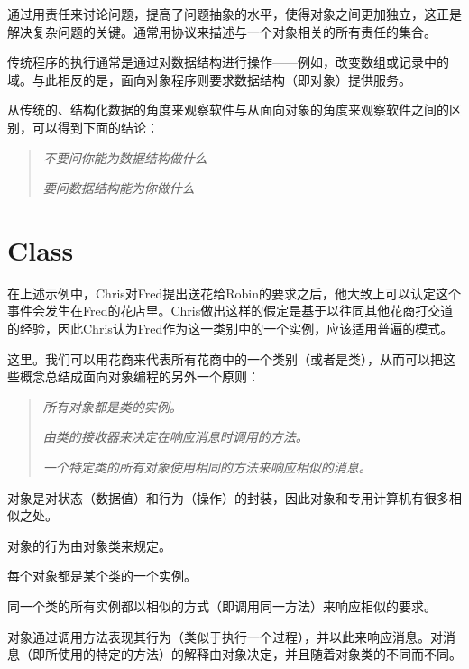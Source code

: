 通过用责任来讨论问题，提高了问题抽象的水平，使得对象之间更加独立，这正是解决复杂问题的关键。通常用协议来描述与一个对象相关的所有责任的集合。

传统程序的执行通常是通过对数据结构进行操作——例如，改变数组或记录中的域。与此相反的是，面向对象程序则要求数据结构（即对象）提供服务。


从传统的、结构化数据的角度来观察软件与从面向对象的角度来观察软件之间的区别，可以得到下面的结论：

\begin{quote}
\emph{不要问你能为数据结构做什么}

\emph{要问数据结构能为你做什么}
\end{quote}

\section{Class}

在上述示例中，Chris对Fred提出送花给Robin的要求之后，他大致上可以认定这个事件会发生在Fred的花店里。Chris做出这样的假定是基于以往同其他花商打交道的经验，因此Chris认为Fred作为这一类别中的一个实例，应该适用普遍的模式。

这里。我们可以用花商来代表所有花商中的一个类别（或者是类），从而可以把这些概念总结成面向对象编程的另外一个原则：

\begin{quote}
\emph{所有对象都是类的实例。}

\emph{由类的接收器来决定在响应消息时调用的方法。}

\emph{一个特定类的所有对象使用相同的方法来响应相似的消息。}
\end{quote}

对象是对状态（数据值）和行为（操作）的封装，因此对象和专用计算机有很多相似之处。

\begin{compactitem}
\item 对象的行为由对象类来规定。
\item 每个对象都是某个类的一个实例。
\item 同一个类的所有实例都以相似的方式（即调用同一方法）来响应相似的要求。
\end{compactitem}





对象通过调用方法表现其行为（类似于执行一个过程），并以此来响应消息。对消息（即所使用的特定的方法）的解释由对象决定，并且随着对象类的不同而不同。



